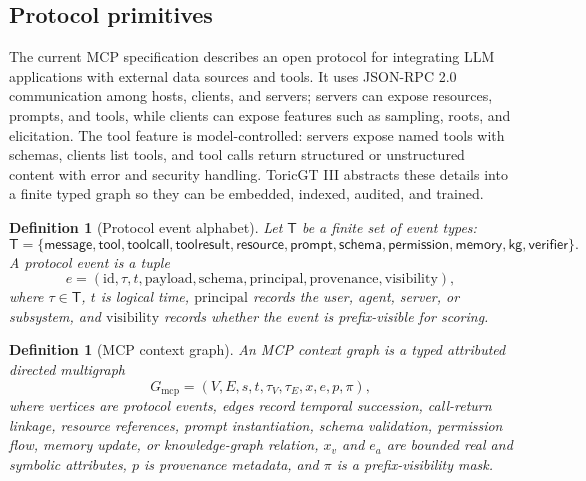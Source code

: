\documentclass[11pt]{article}
\newtheorem{definition}[theorem]{Definition}
\numberwithin{equation}{section}
\begin{document}
\subsection{Protocol primitives}
The current MCP specification describes an open protocol for integrating LLM applications with external data sources and tools. It uses JSON-RPC 2.0 communication among hosts, clients, and servers; servers can expose resources, prompts, and tools, while clients can expose features such as sampling, roots, and elicitation. The tool feature is model-controlled: servers expose named tools with schemas, clients list tools, and tool calls return structured or unstructured content with error and security handling. ToricGT III abstracts these details into a finite typed graph so they can be embedded, indexed, audited, and trained.

\begin{definition}[Protocol event alphabet]
Let $\mathsf{T}$ be a finite set of event types:
\begin{equation}
\mathsf{T}=\{\mathsf{message},\mathsf{tool},\mathsf{toolcall},\mathsf{toolresult},\mathsf{resource},\mathsf{prompt},\mathsf{schema},\mathsf{permission},\mathsf{memory},\mathsf{kg},\mathsf{verifier}\}.
\end{equation}
A protocol event is a tuple
\begin{equation}
 e=(\mathrm{id},\tau, t, \mathrm{payload},\mathrm{schema},\mathrm{principal},\mathrm{provenance},\mathrm{visibility}),
\end{equation}
where $\tau\in\mathsf{T}$, $t$ is logical time, $\mathrm{principal}$ records the user, agent, server, or subsystem, and $\mathrm{visibility}$ records whether the event is prefix-visible for scoring.
\end{definition}

\begin{definition}[MCP context graph]
An MCP context graph is a typed attributed directed multigraph
\begin{equation}
G_{\mathrm{mcp}}=(V,E,s,t,\tau_V,\tau_E,x,e,p,\pi),
\end{equation}
where vertices are protocol events, edges record temporal succession, call-return linkage, resource references, prompt instantiation, schema validation, permission flow, memory update, or knowledge-graph relation, $x_v$ and $e_a$ are bounded real and symbolic attributes, $p$ is provenance metadata, and $\pi$ is a prefix-visibility mask.
\end{definition}
\end{document}
